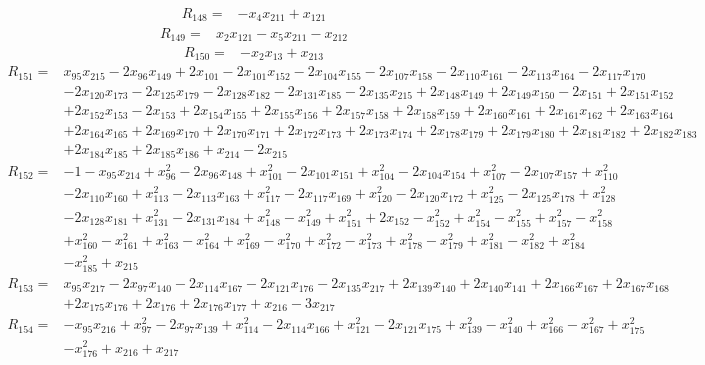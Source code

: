 \begin{align*}
R_{148}={}&-x_{4}x_{211}+x_{121}
\end{align*}
\begin{align*}
R_{149}={}&x_{2}x_{121}-x_{5}x_{211}-x_{212}
\end{align*}
\begin{align*}
R_{150}={}&-x_{2}x_{13}+x_{213}
\end{align*}
\begin{align*}
R_{151}={}&x_{95}x_{215}-2x_{96}x_{149}+2x_{101}-2x_{101}x_{152}-2x_{104}x_{155}-2x_{107}x_{158}-2x_{110}x_{161}-2x_{113}x_{164}-2x_{117}x_{170}\\
{}&-2x_{120}x_{173}-2x_{125}x_{179}-2x_{128}x_{182}-2x_{131}x_{185}-2x_{135}x_{215}+2x_{148}x_{149}+2x_{149}x_{150}-2x_{151}+2x_{151}x_{152}\\
{}&+2x_{152}x_{153}-2x_{153}+2x_{154}x_{155}+2x_{155}x_{156}+2x_{157}x_{158}+2x_{158}x_{159}+2x_{160}x_{161}+2x_{161}x_{162}+2x_{163}x_{164}\\
{}&+2x_{164}x_{165}+2x_{169}x_{170}+2x_{170}x_{171}+2x_{172}x_{173}+2x_{173}x_{174}+2x_{178}x_{179}+2x_{179}x_{180}+2x_{181}x_{182}+2x_{182}x_{183}\\
{}&+2x_{184}x_{185}+2x_{185}x_{186}+x_{214}-2x_{215}
\end{align*}
\begin{align*}
R_{152}={}&-1-x_{95}x_{214}+x_{96}^{2}-2x_{96}x_{148}+x_{101}^{2}-2x_{101}x_{151}+x_{104}^{2}-2x_{104}x_{154}+x_{107}^{2}-2x_{107}x_{157}+x_{110}^{2}\\
{}&-2x_{110}x_{160}+x_{113}^{2}-2x_{113}x_{163}+x_{117}^{2}-2x_{117}x_{169}+x_{120}^{2}-2x_{120}x_{172}+x_{125}^{2}-2x_{125}x_{178}+x_{128}^{2}\\
{}&-2x_{128}x_{181}+x_{131}^{2}-2x_{131}x_{184}+x_{148}^{2}-x_{149}^{2}+x_{151}^{2}+2x_{152}-x_{152}^{2}+x_{154}^{2}-x_{155}^{2}+x_{157}^{2}-x_{158}^{2}\\
{}&+x_{160}^{2}-x_{161}^{2}+x_{163}^{2}-x_{164}^{2}+x_{169}^{2}-x_{170}^{2}+x_{172}^{2}-x_{173}^{2}+x_{178}^{2}-x_{179}^{2}+x_{181}^{2}-x_{182}^{2}+x_{184}^{2}\\
{}&-x_{185}^{2}+x_{215}
\end{align*}
\begin{align*}
R_{153}={}&x_{95}x_{217}-2x_{97}x_{140}-2x_{114}x_{167}-2x_{121}x_{176}-2x_{135}x_{217}+2x_{139}x_{140}+2x_{140}x_{141}+2x_{166}x_{167}+2x_{167}x_{168}\\
{}&+2x_{175}x_{176}+2x_{176}+2x_{176}x_{177}+x_{216}-3x_{217}
\end{align*}
\begin{align*}
R_{154}={}&-x_{95}x_{216}+x_{97}^{2}-2x_{97}x_{139}+x_{114}^{2}-2x_{114}x_{166}+x_{121}^{2}-2x_{121}x_{175}+x_{139}^{2}-x_{140}^{2}+x_{166}^{2}-x_{167}^{2}+x_{175}^{2}\\
{}&-x_{176}^{2}+x_{216}+x_{217}
\end{align*}
